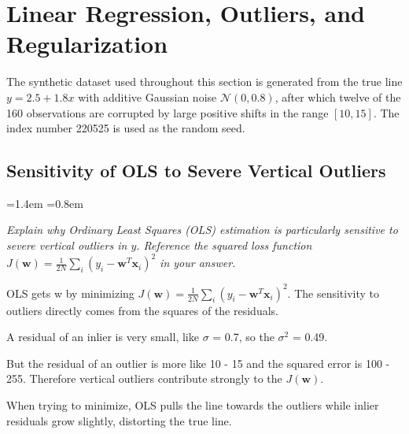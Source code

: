 \documentclass[12pt,a4paper]{article}
\newcommand{\qtext}[1]{%
  \begin{list}{}{\leftmargin=1.4em \rightmargin=0.8em
                 \topsep=3pt \parsep=0pt \itemsep=0pt}
  \item[]\itshape #1
  \end{list}}
\begin{document}
\begingroup
\singlespacing

\tableofcontents
\clearpage

\listoffigures
\vspace{1.0cm}
\listoftables

\endgroup
\clearpage

\setcounter{page}{1}

\section{Linear Regression, Outliers, and Regularization}

The synthetic dataset used throughout this section is generated from the true line
$y = 2.5 + 1.8x$ with additive Gaussian noise $\mathcal{N}(0, 0.8)$, after which twelve of the
160 observations are corrupted by large positive shifts in the range $[10, 15]$. The index number
220525 is used as the random seed.



\subsection{Sensitivity of OLS to Severe Vertical Outliers}

\qtext{Explain why Ordinary Least Squares (OLS) estimation is particularly sensitive to severe
vertical outliers in $y$. Reference the squared loss function
$J(\mathbf{w}) = \frac{1}{2N}\sum_i (y_i - \mathbf{w}^T\mathbf{x}_i)^2$ in your answer.}

OLS gets w by minimizing $J(\mathbf{w}) = \frac{1}{2N} \sum_{i} (y_i - \mathbf{w}^T\mathbf{x}_i)^2$.
The sensitivity to outliers directly comes from the squares of the residuals.

A residual of an inlier is very small, like $\sigma$ = 0.7, so the $\sigma^2$ = 0.49.

But the residual of an outlier is more like 10 - 15 and the squared error is 100 - 255. Therefore
vertical outliers contribute strongly to the $J(\mathbf{w})$.

When trying to minimize, OLS pulls the line towards the outliers while inlier residuals grow
slightly, distorting the true line.
\end{document}
